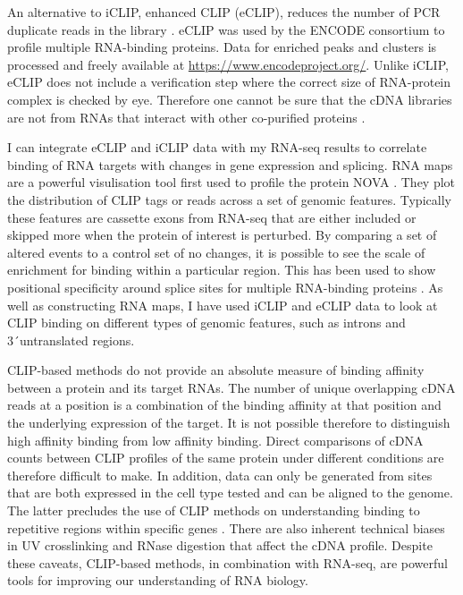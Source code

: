 An alternative to iCLIP, enhanced CLIP (eCLIP), reduces the number of PCR duplicate reads in the library  \citep{Van_Nostrand2016-su}. 
eCLIP was used by the ENCODE consortium to profile multiple RNA-binding proteins. 
Data for enriched peaks and clusters is processed and freely available at \url{https://www.encodeproject.org/}. 
Unlike iCLIP, eCLIP does not include a verification step where the correct size of RNA-protein complex is checked by eye.
Therefore one cannot be sure that the cDNA libraries are not from RNAs that interact with other co-purified proteins \citep{Chakrabarti2018}.

I can integrate eCLIP and iCLIP data with my RNA-seq results to correlate binding of RNA targets with changes in gene expression and splicing.
RNA maps are a powerful visulisation tool first used to profile the protein NOVA \citep{Ule2006}.
They plot the distribution of CLIP tags or reads across a set of genomic features.
Typically these features are cassette exons from RNA-seq that are either included or skipped more when the protein of interest is perturbed.
By comparing a set of altered events to a control set of no changes, it is possible to see the scale of enrichment for binding within a particular region. 
This has been used to show positional specificity around splice sites for multiple RNA-binding proteins \citep{Ule2006, Wang2010,Konig2010}.
As well as constructing RNA maps, I have used iCLIP and eCLIP data to look at CLIP binding on different types of genomic features, such as introns and 3\'\ untranslated regions.

CLIP-based methods do not provide an absolute measure of binding affinity between a protein and its target RNAs. 
The number of unique overlapping cDNA reads at a position is a combination of the binding affinity at that position and the underlying expression of the target.
It is not possible therefore to distinguish high affinity binding from low affinity binding. 
Direct comparisons of cDNA counts between CLIP profiles of the same protein under different conditions are therefore difficult to make.
In addition, data can only be generated from sites that are both expressed in the cell type tested and can be aligned to the genome. 
The latter precludes the use of CLIP methods on understanding binding to repetitive regions within specific genes \citep{Chakrabarti2018}.
There are also inherent technical biases in UV crosslinking and RNase digestion that affect the cDNA profile.
Despite these caveats, CLIP-based methods, in combination with RNA-seq, are powerful tools for improving our understanding of RNA biology.


